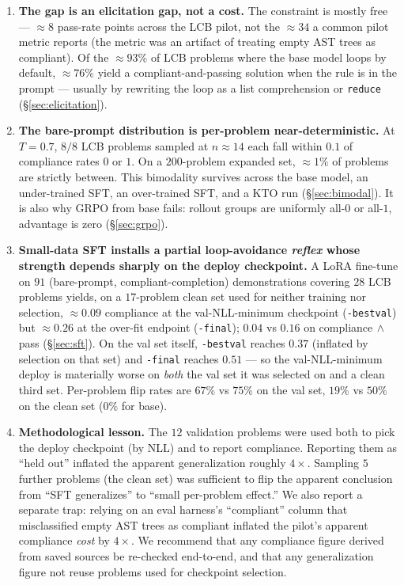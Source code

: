 \documentclass[11pt]{article}
\begin{document}
\begin{enumerate}
\itemsep0pt
\item \textbf{The gap is an elicitation gap, not a cost.} The constraint is mostly free --- $\approx 8$ pass-rate points across the LCB pilot, not the $\approx 34$ a common pilot metric reports (the metric was an artifact of treating empty AST trees as compliant). Of the $\approx 93\%$ of LCB problems where the base model loops by default, $\approx 76\%$ yield a compliant-and-passing solution when the rule is in the prompt --- usually by rewriting the loop as a list comprehension or \texttt{reduce} (\S\ref{sec:elicitation}).
\item \textbf{The bare-prompt distribution is per-problem near-deterministic.} At $T=0.7$, $8/8$ LCB problems sampled at $n \approx 14$ each fall within $0.1$ of compliance rates $0$ or $1$. On a $200$-problem expanded set, $\approx 1\%$ of problems are strictly between. This bimodality survives across the base model, an under-trained SFT, an over-trained SFT, and a KTO run (\S\ref{sec:bimodal}). It is also why GRPO from base fails: rollout groups are uniformly all-$0$ or all-$1$, advantage is zero (\S\ref{sec:grpo}).
\item \textbf{Small-data SFT installs a partial loop-avoidance \emph{reflex} whose strength depends sharply on the deploy checkpoint.} A LoRA fine-tune on $91$ (bare-prompt, compliant-completion) demonstrations covering $28$ LCB problems yields, on a $17$-problem clean set used for neither training nor selection, $\approx 0.09$ compliance at the val-NLL-minimum checkpoint (\texttt{-bestval}) but $\approx 0.26$ at the over-fit endpoint (\texttt{-final}); $0.04$ vs $0.16$ on compliance$\,\wedge\,$pass (\S\ref{sec:sft}). On the val set itself, \texttt{-bestval} reaches $0.37$ (inflated by selection on that set) and \texttt{-final} reaches $0.51$ --- so the val-NLL-minimum deploy is materially worse on \emph{both} the val set it was selected on and a clean third set. Per-problem flip rates are $67\%$ vs $75\%$ on the val set, $19\%$ vs $50\%$ on the clean set ($0\%$ for base).
\item \textbf{Methodological lesson.} The $12$ validation problems were used both to pick the deploy checkpoint (by NLL) and to report compliance. Reporting them as ``held out'' inflated the apparent generalization roughly $4\times$. Sampling $5$ further problems (the clean set) was sufficient to flip the apparent conclusion from ``SFT generalizes'' to ``small per-problem effect.'' We also report a separate trap: relying on an eval harness's ``compliant'' column that misclassified empty AST trees as compliant inflated the pilot's apparent compliance \emph{cost} by $4\times$. We recommend that any compliance figure derived from saved sources be re-checked end-to-end, and that any generalization figure not reuse problems used for checkpoint selection.
\end{enumerate}
\end{document}
